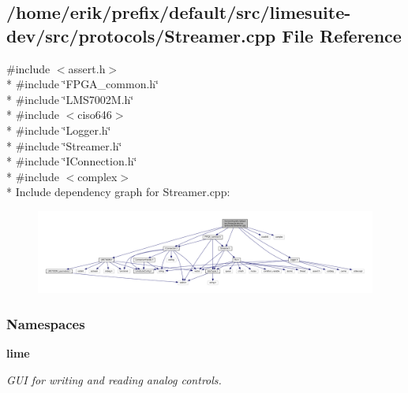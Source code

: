 \subsection{/home/erik/prefix/default/src/limesuite-\/dev/src/protocols/\+Streamer.cpp File Reference}
\label{Streamer_8cpp}
{\ttfamily \#include $<$assert.\+h$>$}\\*
{\ttfamily \#include \char`\"{}F\+P\+G\+A\+\_\+common.\+h\char`\"{}}\\*
{\ttfamily \#include \char`\"{}L\+M\+S7002\+M.\+h\char`\"{}}\\*
{\ttfamily \#include $<$ciso646$>$}\\*
{\ttfamily \#include \char`\"{}Logger.\+h\char`\"{}}\\*
{\ttfamily \#include \char`\"{}Streamer.\+h\char`\"{}}\\*
{\ttfamily \#include \char`\"{}I\+Connection.\+h\char`\"{}}\\*
{\ttfamily \#include $<$complex$>$}\\*
Include dependency graph for Streamer.\+cpp\+:
\nopagebreak
\begin{figure}[H]
\begin{center}
\leavevmode
\includegraphics[width=350pt]{d8/dba/Streamer_8cpp__incl}
\end{center}
\end{figure}
\subsubsection*{Namespaces}
\begin{DoxyCompactItemize}
\item 
 {\bf lime}
\begin{DoxyCompactList}\small\item\em G\+UI for writing and reading analog controls. \end{DoxyCompactList}\end{DoxyCompactItemize}
